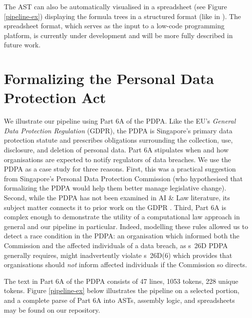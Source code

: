 \documentclass{IOS-Book-Article}
\begin{document}
The AST can also be automatically visualised in a spreadsheet (see Figure \ref{pipeline-ex}) displaying the formula trees in a structured format (like in \cite{mochales_study_2008}). The spreadsheet format, which serves as the input to a low-code programming platform, is currently under development and will be more fully described in future work.

\section{Formalizing the Personal Data Protection Act}
\label{sec:pdpa}

We illustrate our pipeline using Part 6A of the PDPA. Like the EU's \textit{General Data Protection Regulation} (GDPR), the PDPA is Singapore's primary data protection statute and prescribes obligations surrounding the collection, use, disclosure, and deletion of personal data. Part 6A stipulates when and how organisations are expected to notify regulators of data breaches. We use the PDPA as a case study for three reasons. First, this was a practical suggestion from Singapore's Personal Data Protection Commission (who hypothesised that formalizing the PDPA would help them better manage legislative change).
Second, while the PDPA has not been examined in AI \& Law literature, its subject matter connects it to prior work on the GDPR \cite{palmirani_modelling_2018,palmirani_legal_2018,hickey_gdpr_2021}.
Third, Part 6A is complex enough to demonstrate the utility of a computational law approach in general and our pipeline in particular. Indeed, modelling these rules allowed us to detect a race condition in the PDPA: an organisation which informed both the Commission and the affected individuals of a data breach, as s~26D PDPA generally requires, might inadvertently violate s~26D(6) which provides that organisations should \textit{not} inform affected individuals if the Commission so directs.

The text in Part 6A of the PDPA consists of 47 lines, 1053 tokens, 228 unique tokens.
Figure \ref{pipeline-ex} below illustrates the pipeline on a selected portion, and a complete parse of Part 6A into ASTs, assembly logic, and spreadsheets may be found on our repository.
\end{document}
